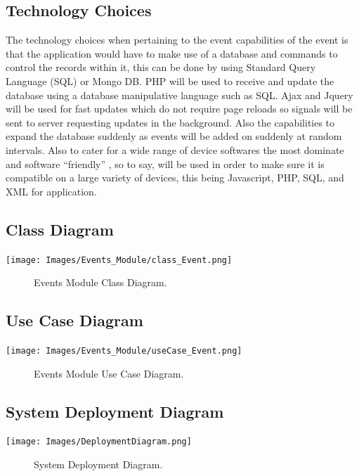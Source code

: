 \documentclass[a4paper, 12pt, one column]{article}
\begin{document}
\subsection{Technology Choices}
The technology choices when pertaining to the event capabilities of the event is that the application would have to make use of a database and commands to control the records within it, this can be done by using Standard Query Language (SQL) or Mongo DB. PHP will be used to receive and update the database using a database manipulative language such as SQL. Ajax and Jquery will be used for fast updates which do not require page reloads so signals will be sent to server requesting updates in the background. Also the capabilities to expand the database suddenly as events will be added on suddenly at random intervals.
Also to cater for a wide range of device softwares the most dominate and software “friendly” , so to say, will be used in order to make sure it is compatible on a large variety of devices, this being Javascript, PHP, SQL, and XML for application.


\subsection{Class Diagram}
        \texttt{[image: Images/Events\_Module/class\_Event.png]}
        \begin{figure}[h]
            \caption{Events Module Class Diagram.}
        \end{figure}
        
\subsection{Use Case Diagram}
        \texttt{[image: Images/Events\_Module/useCase\_Event.png]}
        \begin{figure}[h]
            \caption{Events Module Use Case Diagram.}
        \end{figure}
        



     
        
\begin{center}
\section{System Deployment Diagram}
        \texttt{[image: Images/DeploymentDiagram.png]}
        \begin{figure}[h]
            \caption{System Deployment Diagram.}
        \end{figure}
        
\end{center}
        
\end{document}
